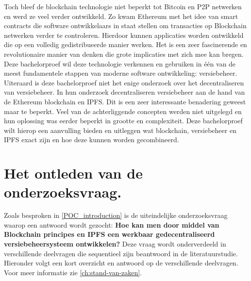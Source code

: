 Toch bleef de blockchain technologie niet beperkt tot Bitcoin en P2P netwerken en werd ze veel verder ontwikkeld. Zo kwam Ethereum met het idee van smart contracts die software ontwikkelaars in staat stellen om transacties op Blockchain netwerken verder te controleren. Hierdoor kunnen applicaties worden ontwikkeld die op een volledig gedistribueerde manier werken. Het is een zeer fascinerende en revolutionaire manier van denken die grote implicaties met zich mee kan bregen.\\

Deze bachelorproef wil deze technologie verkennen en gebruiken in één van de meest fundamentele stappen van moderne software ontwikkeling: versiebeheer.\\

Uiteraard is deze bachelorproef niet het enige onderzoek over het decentraliseren van versiebeheer. In hun onderzoek decentraliseren \textcite{Nizamuddin2019} versiebeheer aan de hand van de Ethereum blockchain en IPFS. Dit is een zeer interessante benadering geweest maar te beperkt. Veel van de achterliggende concepten werden niet uitgelegd en hun oplossing was eerder beperkt in grootte en complexiteit. Deze bachelorproef wilt hierop een aanvulling bieden en uitleggen wat blockchain, versiebeheer en IPFS exact zijn en hoe deze kunnen worden gecombineerd.

\section{Het ontleden van de onderzoeksvraag.}
\label{ontleden van de onderzoeksvraag}
Zoals besproken in \ref{POC_introduction} is de uiteindelijke onderzoeksvraag waarop een antwoord wordt gezocht: \textbf{Hoe kan men door middel van Blockchain principes en IPFS een werkbaar gedecentraliseerd versiebeheersysteem ontwikkelen?} Deze vraag wordt onderverdeeld in verschillende deelvragen die sequentieel zijn beantwoord in de literatuurstudie. Hieronder volgt een kort overzicht en antwoord op de verschillende deelvragen. Voor meer informatie zie \ref{ch:stand-van-zaken}.
 
